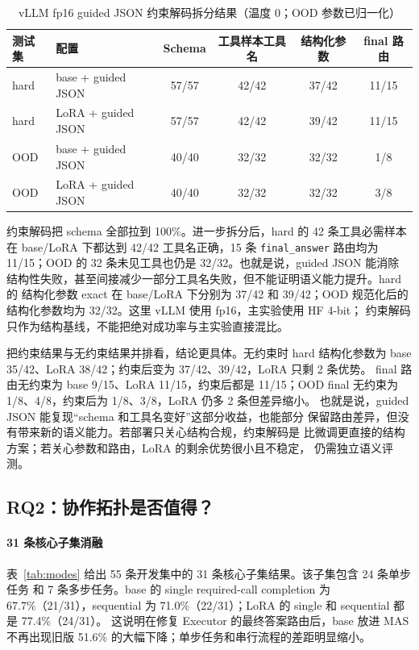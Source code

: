 \documentclass[UTF8,a4paper,12pt]{ctexart}
\begin{document}
\begin{table}[H]
  \centering
  \small
  \caption{vLLM fp16 guided JSON 约束解码拆分结果（温度 0；OOD 参数已归一化）}
  \label{tab:constrained}
  \begin{tabular}{llcccc}
    \toprule
    测试集 & 配置 & Schema & 工具样本工具名 & 结构化参数 & final 路由 \\
    \midrule
    hard & base + guided JSON & 57/57 & 42/42 & 37/42 & 11/15 \\
    hard & LoRA + guided JSON & 57/57 & 42/42 & 39/42 & 11/15 \\
    OOD & base + guided JSON & 40/40 & 32/32 & 32/32 & 1/8 \\
    OOD & LoRA + guided JSON & 40/40 & 32/32 & 32/32 & 3/8 \\
    \bottomrule
  \end{tabular}
\end{table}

约束解码把 schema 全部拉到 100\%。进一步拆分后，hard 的 42 条工具必需样本
在 base/LoRA 下都达到 42/42 工具名正确，15 条 \texttt{final\_answer} 路由均为
11/15；OOD 的 32 条未见工具也仍是 32/32。也就是说，guided JSON 能消除
结构性失败，甚至间接减少一部分工具名失败，但不能证明语义能力提升。hard 的
结构化参数 exact 在 base/LoRA 下分别为 37/42 和 39/42；OOD 规范化后的
结构化参数均为 32/32。这里 vLLM 使用 fp16，主实验使用 HF 4-bit；
约束解码只作为结构基线，不能把绝对成功率与主实验直接混比。

把约束结果与无约束结果并排看，结论更具体。无约束时 hard 结构化参数为
base 35/42、LoRA 38/42；约束后变为 37/42、39/42，LoRA 只剩 2 条优势。
final 路由无约束为 base 9/15、LoRA 11/15，约束后都是 11/15；OOD final
无约束为 1/8、4/8，约束后为 1/8、3/8，LoRA 仍多 2 条但差异缩小。
也就是说，guided JSON 能复现“schema 和工具名变好”这部分收益，也能部分
保留路由差异，但没有带来新的语义能力。若部署只关心结构合规，约束解码是
比微调更直接的结构方案；若关心参数和路由，LoRA 的剩余优势很小且不稳定，
仍需独立语义评测。

\subsection{RQ2：协作拓扑是否值得？}

\paragraph{31 条核心子集消融}
表~\ref{tab:modes} 给出 55 条开发集中的 31 条核心子集结果。该子集包含 24 条单步任务
和 7 条多步任务。base 的 single required-call completion 为 67.7\%（21/31），sequential 为
71.0\%（22/31）；LoRA 的 single 和 sequential 都是 77.4\%（24/31）。
这说明在修复 Executor 的最终答案路由后，base 放进 MAS 不再出现旧版
51.6\% 的大幅下降；单步任务和串行流程的差距明显缩小。
\end{document}
